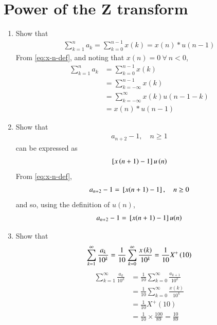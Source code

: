 \documentclass[journal,12pt,twocolumn]{IEEEtran}
\renewcommand\thesection{\arabic{section}}
\begin{document}
\section{Power of the Z transform}
\begin{enumerate}[label=\thesection.\arabic*,ref=\thesection.\theenumi]
\item Show that 
\begin{align}
	\sum_{k=1}^{n}a_k = 
	\sum_{k=0}^{n-1}x(k) = x(n)*u(n-1)
\end{align}
\solution From \eqref{eq:x-n-def}, and noting that $x(n) = 0\ \forall\ n < 0$,
\begin{align}
    \sum_{k=1}^{n}a_k &= \sum_{k=0}^{n-1}x(k) \\
                      &= \sum_{k = -\infty}^{n - 1}x(k) \\
                      &= \sum_{k = -\infty}^{\infty}x(k)u(n - 1 - k) \\
                      &= x(n)*u(n - 1)
\end{align}
\item Show that 
\begin{align}
a_{n+2}-1, \quad n \ge 1
\end{align}
can be expressed as 
\begin{align}
	{}\left[x\left(n+1\right)-1\right]u\left(n\right)
\end{align}
\solution From \eqref{eq:x-n-def},
\begin{align}
    a_{n+2} - 1 = {}\left[x(n + 1) - 1\right], \quad n \ge 0
\end{align}
and so, using the definition of $u(n)$,
\begin{align}
    a_{n+2} - 1 = {}\left[x(n + 1) - 1\right]u(n)
\end{align}
\item Show that 
\begin{align}
	\sum_{k=1}^{\infty}\frac{a_k}{10^k}= 
	\frac{1}{10}\sum_{k=0}^{\infty}\frac{x\left(k\right)}{10^k} =\frac{1}{10}X^{+}\left({10}\right)
\end{align}
\label{pr:1-2}
\solution 
\begin{align}
    \sum_{k=1}^{\infty}\frac{a_k}{10^k} &= \frac{1}{10}\sum_{k = 0}^{\infty}\frac{a_{k+1}}{10^k} \\
                                        &= \frac{1}{10}\sum_{k = 0}^{\infty}\frac{x(k)}{10^k} \\
                                        &= \frac{1}{10}X^+(10) \\
                                        &= \frac{1}{10}\times\frac{100}{89} = \frac{10}{89}

\end{align}
\end{enumerate}
\end{document}
